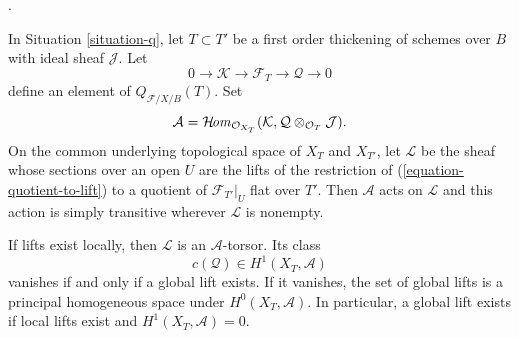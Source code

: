 \begin{lemma}
\label{lemma-quotient-lifts-torsor}
\begin{reference}
\cite[Expos\'e 221, Proposition 5.1 and Corollary 5.2]{FGA}.
\end{reference}
In Situation \ref{situation-q}, let $T \subset T'$ be a first order
thickening of schemes over $B$ with ideal sheaf $\mathcal{J}$. Let
\begin{equation}
\label{equation-quotient-to-lift}
0 \longrightarrow \mathcal{K} \longrightarrow \mathcal{F}_T
\longrightarrow \mathcal{Q} \longrightarrow 0
\end{equation}
define an element of $Q_{\mathcal{F}/X/B}(T)$. Set
$$
\mathcal{A} =
\mathop{\mathcal{H}\!\mathit{om}}\nolimits_{\mathcal{O}_{X_T}}
(\mathcal{K},
\mathcal{Q} \otimes_{\mathcal{O}_T} \mathcal{J}).
$$
On the common underlying topological space of $X_T$ and $X_{T'}$, let
$\mathcal{L}$ be the sheaf whose sections over an open $U$ are the lifts of
the restriction of (\ref{equation-quotient-to-lift}) to a quotient of
$\mathcal{F}_{T'}|_U$ flat over $T'$. Then $\mathcal{A}$ acts on
$\mathcal{L}$ and this action is simply transitive wherever
$\mathcal{L}$ is nonempty.

If lifts exist locally, then $\mathcal{L}$ is an $\mathcal{A}$-torsor. Its
class
$$
c(\mathcal{Q}) \in H^1(X_T, \mathcal{A})
$$
vanishes if and only if a global lift exists. If it vanishes, the set of
global lifts is a principal homogeneous space under
$H^0(X_T, \mathcal{A})$. In particular, a global lift exists if local lifts
exist and $H^1(X_T, \mathcal{A}) = 0$.
\end{lemma}

